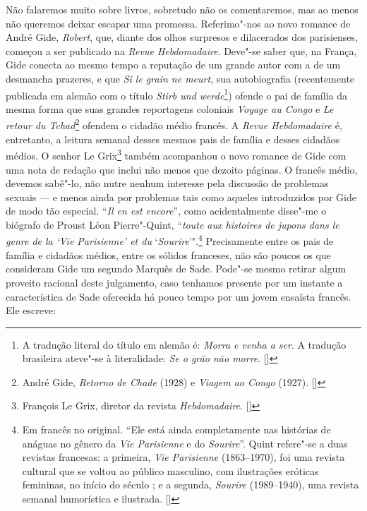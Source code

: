 Não falaremos muito sobre livros, sobretudo não os comentaremos, mas ao
menos não queremos deixar escapar uma promessa. Referimo"-nos ao novo
romance de André Gide, \emph{Robert}, que, diante dos olhos surpresos e
dilacerados dos parisienses, começou a ser publicado na \emph{Revue
Hebdomadaire}. Deve"-se saber que, na França, Gide conecta ao mesmo tempo
a reputação de um grande autor com a de um desmancha prazeres, e que
\emph{Si le grain ne meurt}, sua autobiografia (recentemente publicada
em alemão com o título \emph{Stirb und werde}\footnote{A tradução
  literal do título em alemão é: \emph{Morra e venha a ser}. A tradução
  brasileira ateve"-se à literalidade: \emph{Se o grão não morre}. []})
ofende o pai de família da mesma forma que suas grandes reportagens
coloniais \emph{Voyage au Congo} e \emph{Le retour du Tchad}\footnote{André Gide, \emph{Retorno de Chade} (1928) e \emph{Viagem ao Congo} (1927). []} ofendem
o cidadão médio francês. A \emph{Revue Hebdomadaire} é, entretanto, a
leitura semanal desses mesmos pais de família e desses cidadãos médios. O
senhor Le Grix\footnote{‎François Le Grix, diretor da revista
  \emph{Hebdomadaire}. []} também acompanhou o novo romance de Gide com uma
nota de redação que inclui não menos que dezoito páginas. O francês
médio, devemos sabê"-lo, não nutre nenhum interesse pela discussão de
problemas sexuais --- e menos ainda por problemas tais como aqueles
introduzidos por Gide de modo tão especial. ``\emph{Il en est encore}'',
como acidentalmente disse"-me o biógrafo de Proust Léon Pierre"-Quint,
``\emph{toute aux histoires de jupons dans le genre de la} \emph{`Vie
Parisienne' et du} `\emph{Sourire}'".\footnote{Em francês no
  original. ``Ele está ainda completamente nas histórias de anáguas no
  gênero da \emph{Vie Parisienne} e do \emph{Sourire}''. Quint refere"-se a duas
  revistas francesas: a primeira, \emph{Vie Parisienne}
  (1863--1970), foi uma revista cultural que se voltou ao público
  masculino, com ilustrações eróticas femininas, no início do século ;
  e a segunda, \emph{Sourire} (1989--1940), uma revista semanal
  humorística e ilustrada. []} Precisamente entre os pais de família e
cidadãos médios, entre os sólidos franceses, não são poucos os que
consideram Gide um segundo Marquês de Sade. Pode"-se mesmo retirar algum
proveito racional deste julgamento, caso tenhamos presente por um
instante a característica de Sade oferecida há pouco tempo por um jovem
ensaísta francês. Ele escreve:

